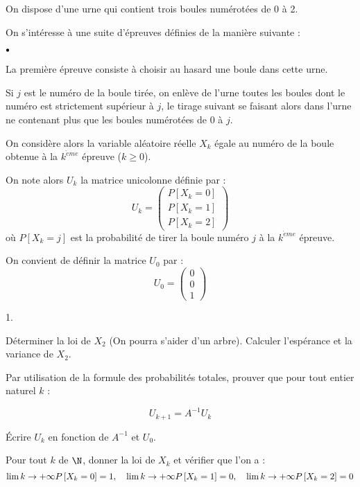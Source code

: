 \documentclass[11pt]{article}%
\begin{document}
On dispose d'une urne qui contient trois boules numérotées de 0 à 2.

On s'intéresse à une suite d'épreuves définies de la manière suivante :

\begin{noliste}{$\scriptstyle \bullet$}
\item La première épreuve consiste à choisir au hasard une boule dans
cette urne.

\item Si $j$ est le numéro de la boule tirée, on enlève de l'urne
toutes les
boules dont le numéro est strictement supérieur à $j$, le tirage
suivant se
faisant alors dans l'urne ne contenant plus que les boules numérotées
de $0$ à $j$.
\end{noliste}

On considère alors la variable aléatoire réelle $X_{k}$ égale au numéro
de
la boule obtenue à la $k^{\grave{e}me}$ épreuve ($k\geq 0$).

On note alors $U_{k}$ la matrice unicolonne définie par : 
\[
U_{k} = \left( 
\begin{array}{c}
P\left[ X_{k} = 0\right] \\
P\left[ X_{k} = 1\right] \\
P\left[ X_{k} = 2\right]
\end{array}
\right)
\]
où $P\left[ X_{k} = j\right] $ est la probabilité de tirer la boule
numéro $j$ à la $k^{\grave{e}me}$ épreuve.

On convient de définir la matrice $U_{0}$ par : 
\[
U_{0} = \left( 
\begin{array}{c}
0 \\
0 \\
1
\end{array}
\right)
\]

\begin{noliste}{1.}
 \setlength{\itemsep}{4mm}
\item Déterminer la loi de $X_{2}$ (On pourra s'aider d'un arbre).
Calculer l'espérance et la variance de $X_{2}$.

\item Par utilisation de la formule des probabilités totales, prouver
que pour tout entier naturel $k$ :

\[
U_{k + 1} = A^{-1}U_{k}
\]

\item Écrire $U_{k}$ en fonction de $A^{-1}$ et $U_{0}$.

\item Pour tout $k$ de $\N$, donner la loi de $X_{k}$ et vérifier que
l'on a : 
\[
\lim{k\rightarrow + \infty }P\left[ X_{k} = 0\right] = 1,\quad
\lim{k\rightarrow + \infty }P\left[ X_{k} = 1\right] = 0,\quad
\lim{k\rightarrow + \infty }P\left[ X_{k} = 2\right] = 0
\]
\end{noliste}

\label{fin}
\end{document}
